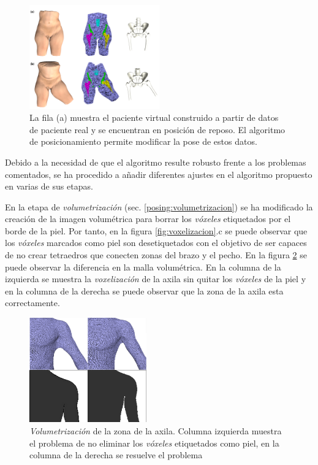 \begin{figure}[h]
   \centering
    \includegraphics[width=0.5\textwidth]{IMG/patient.png}
    \caption{ La fila (a) muestra el paciente virtual construido a partir de datos de paciente real y se encuentran en posición de reposo. El algoritmo de posicionamiento permite modificar la pose de estos datos.
    }
   \label{fig:patient}
\end{figure}
%

Debido a la necesidad de que el algoritmo resulte robusto frente a los problemas comentados, se ha procedido a añadir diferentes ajustes en el algoritmo propuesto en varias de sus etapas.

En la etapa de \emph{volumetrización} (sec. \ref{posing:volumetrizacion}) se ha modificado la creación de la imagen volumétrica para borrar los \emph{vóxeles} etiquetados por el borde de la piel. Por tanto, en la figura \ref{fig:voxelizacion}.c se puede observar que los \emph{vóxeles} marcados como piel son desetiquetados con el objetivo de ser capaces de no crear tetraedros que conecten zonas del brazo y el pecho. En la figura \ref{fig:volsol} se puede observar la diferencia en la malla volumétrica. En la columna de la izquierda se muestra la \emph{voxelización} de la axila sin quitar los \emph{vóxeles} de la piel y en la columna de la derecha se puede observar que la zona de la axila esta correctamente.

\begin{figure}[h]
   \centering
    \includegraphics[width=0.45\textwidth]{IMG/volumetrizacion2.png}
    \caption{
    \emph{Volumetrización} de la zona de la axila. Columna izquierda muestra el problema de no eliminar los \emph{vóxeles} etiquetados como piel, en la columna de la derecha se resuelve el problema }
\label{fig:volsol}
\end{figure}


